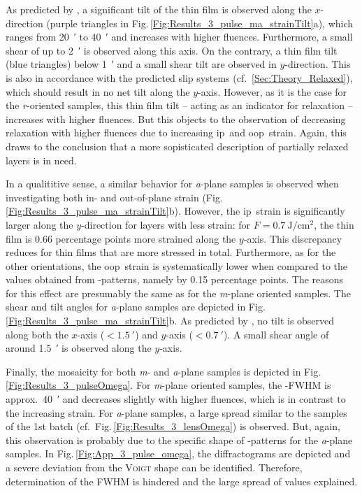 As predicted by \textcite{kneiss2021}, a significant tilt of the thin film is observed along the $x$-direction (purple triangles in Fig.\,\ref{Fig:Results_3_pulse_ma_strainTilt}a), which ranges from \qty{20}{\arcminute} to \qty{40}{\arcminute} and increases with higher fluences.
Furthermore, a small shear of up to \qty{2}{\arcminute} is observed along this axis.
On the contrary, a thin film tilt (blue triangles) below \qty{1}{\arcminute} and a small shear tilt are observed in $y$-direction.
This is also in accordance with the predicted slip systems (cf.~\ref{Sec:Theory_Relaxed}), which should result in no net tilt along the $y$-axis.
However, as it is the case for the \textit{r}-oriented samples, this thin film tilt -- acting as an indicator for relaxation -- increases with higher fluences.
But this objects to the observation of decreasing relaxation with higher fluences due to increasing \gls{ip}\ and \gls{oop}\ strain. 
Again, this draws to the conclusion that a more sopisticated description of partially relaxed layers is in need.

In a qualititive sense, a similar behavior for \textit{a}-plane samples is observed when investigating both in- and out-of-plane strain (Fig.\,\ref{Fig:Results_3_pulse_ma_strainTilt}b).
However, the \gls{ip}\ strain is significantly larger along the $y$-direction for layers with less strain:
for $F=\qty{0.7}{\J\per\cm\squared}$, the thin film is 0.66 percentage points more strained along the $y$-axis.
This discrepancy reduces for thin films that are more stressed in total.
Furthermore, as for the other orientations, the \gls{oop}\ strain is systematically lower when compared to the values obtained from \thetaomega-patterns, namely by 0.15 percentage points.
The reasons for this effect are presumably the same as for the \textit{m}-plane oriented samples.
The shear and tilt angles for \textit{a}-plane samples are depicted in Fig.\,\ref{Fig:Results_3_pulse_ma_strainTilt}b.
As predicted by \textcite{kneiss2021}, no tilt is observed along both the $x$-axis ($<\qty{1.5}{\arcminute}$) and $y$-axis ($<\qty{0.7}{\arcminute}$).
A small shear angle of around \qty{1.5}{\arcminute} is observed along the $y$-axis.

Finally, the mosaicity for both \textit{m}- and \textit{a}-plane samples is depicted in Fig.\,\ref{Fig:Results_3_pulseOmega}.
For \textit{m}-plane oriented samples, the \textomega-FWHM is approx.\ \qty{40}{\arcminute} and decreases slightly with higher fluences, which is in contrast to the increasing strain.
For \textit{a}-plane samples, a large spread similar to the samples of the 1st batch (cf.\ Fig.\,\ref{Fig:Results_3_lensOmega}) is observed.
But, again, this observation is probably due to the specific shape of \textomega-patterns for the \textit{a}-plane samples.
In Fig.\,\ref{Fig:App_3_pulse_omega}, the diffractograms are depicted and a severe deviation from the \textsc{Voigt} shape can be identified.
Therefore, determination of the \gls{FWHM} is hindered and the large spread of values explained.

